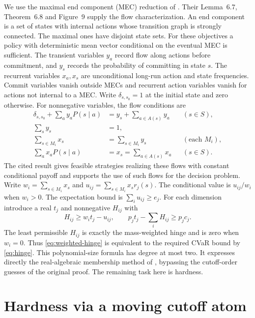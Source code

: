 \documentclass[11pt,a4paper]{amsart}
\begin{document}
We use the maximal end component (MEC) reduction of \cite{km}. Their Lemma~6.7, Theorem~6.8 and Figure~9 supply the flow characterization. An end component is a set of states with internal actions whose transition graph is strongly connected. The maximal ones have disjoint state sets. For these objectives a policy with deterministic mean vector conditional on the eventual MEC is sufficient. The transient variables \(y_a\) record flow along actions before commitment, and \(y_s\) records the probability of committing in state \(s\). The recurrent variables \(x_a,x_s\) are unconditional long-run action and state frequencies. Commit variables vanish outside MECs and recurrent action variables vanish for actions not internal to a MEC. Write \(\delta_{s,s_0}=1\) at the initial state and zero otherwise. For nonnegative variables, the flow conditions are
\begin{align}
 \delta_{s,s_0}+\sum_a y_a P(s\mid a)
    &=y_s+\sum_{a\in A(s)} y_a &&(s\in S),\\
 \sum_s y_s&=1,\\
 \sum_{s\in M_i}x_s&=\sum_{s\in M_i}y_s &&(\text{each }M_i),\\
 \sum_a x_aP(s\mid a)&=x_s=\sum_{a\in A(s)}x_a &&(s\in S).
\end{align}
The cited result gives feasible strategies realizing these flows with constant conditional payoff and supports the use of such flows for the decision problem. Write \(w_i=\sum_{s\in M_i}x_s\) and \(u_{ij}=\sum_{s\in M_i}x_s r_j(s)\). The conditional value is \(u_{ij}/w_i\) when \(w_i>0\). The expectation bound is \(\sum_i u_{ij}\ge e_j\). For each dimension introduce a real \(t_j\) and nonnegative \(H_{ij}\) with
\begin{equation}\label{eq:weighted-hinge}
 H_{ij}\ge w_i t_j-u_{ij},\qquad
 p_j t_j-\sum_i H_{ij}\ge p_j c_j .
\end{equation}
The least permissible \(H_{ij}\) is exactly the mass-weighted hinge and is zero when \(w_i=0\). Thus \eqref{eq:weighted-hinge} is equivalent to the required CVaR bound by \eqref{eq:hinge}. This polynomial-size formula has degree at most two. It expresses directly the real-algebraic membership method of \cite{km}, bypassing the cutoff-order guesses of the original proof. The remaining task here is hardness.

\section{Hardness via a moving cutoff atom}
\end{document}

